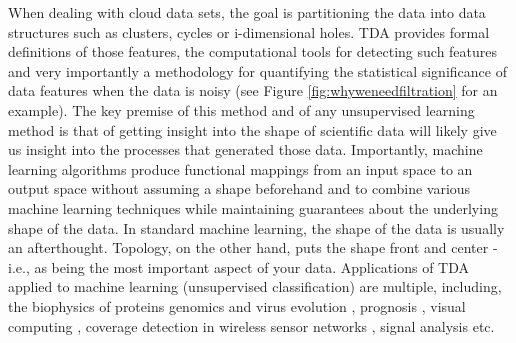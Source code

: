 \documentclass[onecollarge,runningheads]{svjour2}
\begin{document}
When dealing with cloud data sets, the goal is partitioning the data into data structures such as clusters, cycles or i-dimensional holes. TDA provides formal definitions of those features, the computational tools for detecting such features and very importantly a methodology for quantifying the statistical significance of data features when the data is noisy (see Figure \ref{fig:whyweneedfiltration} for an example). The key premise of this method and of any unsupervised learning method is that of getting insight into the shape of scientific data will likely give us insight into the processes that generated those data.
Importantly, machine learning algorithms produce functional mappings from an input space to an output space without assuming a shape beforehand and to combine various machine learning techniques while maintaining guarantees about the underlying shape of the data. In standard machine learning, the shape of the data is usually an afterthought. Topology, on the other hand, puts the shape front and center -i.e., as being the most important aspect of your data.
Applications of TDA applied to machine learning (unsupervised classification) are multiple, including, the biophysics of proteins \cite{gameiro2015topological} genomics and virus evolution \cite{chan2013topology}, prognosis \cite{schmidt2011disease}, visual computing \cite{bendich2010computing}, coverage detection in wireless sensor networks \cite{ghrist2005coverage}, signal analysis \cite{perea2015sliding} etc.


\end{document}
